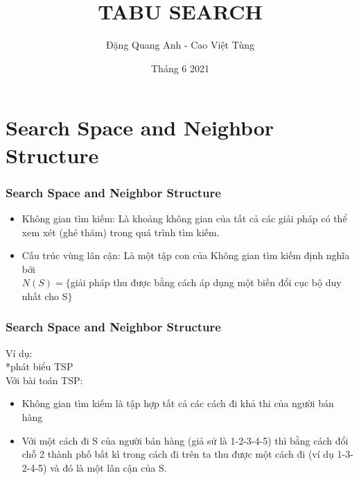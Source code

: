 \documentclass[12pt]{beamer}
\begin{document}
	\author{Đặng Quang Anh - Cao Việt Tùng}
	\title{TABU SEARCH}
	\date{Tháng 6 2021}
	\maketitle
	

	\section{Search Space and Neighbor Structure}
	\begin{frame}
		\frametitle{Search Space and Neighbor Structure}
		\begin{itemize}
			\item Không gian tìm kiếm: Là khoảng không gian của tất cả các giải pháp có thể xem xét (ghé thăm) trong quá trình tìm kiếm.
			\item Cấu trúc vùng lân cận: Là một tập con của Không gian tìm kiếm định nghĩa bởi\\
					$N(S) = \{ $giải pháp thu được bằng cách áp dụng một biến đổi cục bộ duy nhất cho S$ \}$
		\end{itemize}
	\end{frame}

	\begin{frame}
		\frametitle{Search Space and Neighbor Structure}
		Ví dụ:\\
		*phát biểu TSP\\
		Với bài toán TSP:\\
		\begin{itemize}
			\item Không gian tìm kiếm là tập hợp tất cả các cách đi khả thi của người bán hàng
			\item Với một cách đi S của người bán hàng (giả sử là 1-2-3-4-5) thì bằng cách đổi chỗ 2 thành phố bất kì trong cách đi trên ta thu được một cách đi (ví dụ 1-3-2-4-5) và đó là một lân cận của S.
		\end{itemize}
	\end{frame}
	
\end{document}
